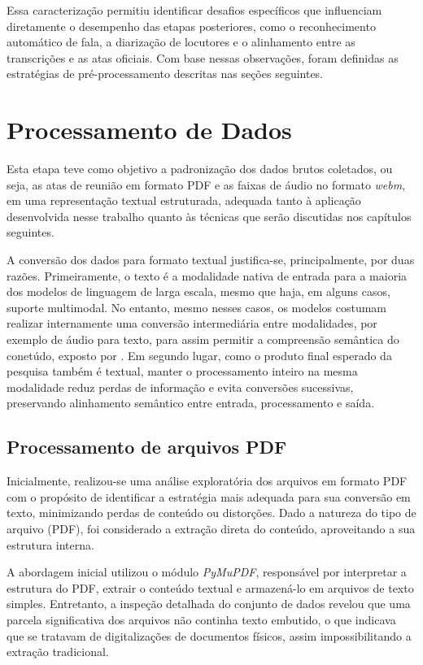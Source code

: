 Essa caracterização permitiu identificar desafios específicos que influenciam diretamente o desempenho das etapas posteriores, como o reconhecimento automático de fala, a diarização de locutores e o alinhamento entre as transcrições e as atas oficiais. Com base nessas observações, foram definidas as estratégias de pré-processamento descritas nas seções seguintes.

\section{Processamento de Dados}
\label{sec:processamento-de-dados}

Esta etapa teve como objetivo a padronização dos dados brutos coletados, ou seja, as atas de reunião em formato PDF e as faixas de áudio no formato \textit{webm}, em uma representação textual estruturada, adequada tanto à aplicação desenvolvida nesse trabalho quanto às técnicas que serão discutidas nos capítulos seguintes.

A conversão dos dados para formato textual justifica-se, principalmente, por duas razões. Primeiramente, o texto é a modalidade nativa de entrada para a maioria dos modelos de linguagem de larga escala, mesmo que haja, em alguns casos, suporte multimodal. No entanto, mesmo nesses casos, os modelos costumam realizar internamente uma conversão intermediária entre modalidades, por exemplo de áudio para texto, para assim permitir a compreensão semântica do conetúdo, exposto por . Em segundo lugar, como o produto final esperado da pesquisa também é textual, manter o processamento inteiro na mesma modalidade reduz perdas de informação e evita conversões sucessivas, preservando alinhamento semântico entre entrada, processamento e saída.

\subsection{Processamento de arquivos PDF}
\label{sec:processamento-de-arquivos-PDF}

Inicialmente, realizou-se uma análise exploratória dos arquivos em formato PDF com o propósito de identificar a estratégia mais adequada para sua conversão em texto, minimizando perdas de conteúdo ou distorções. Dado a natureza do tipo de arquivo (PDF), foi considerado a extração direta do conteúdo, aproveitando a sua estrutura interna. 

A abordagem inicial utilizou o módulo \textit{PyMuPDF}, responsável por interpretar a estrutura do PDF, extrair o conteúdo textual e armazená-lo em arquivos de texto simples. Entretanto, a inspeção detalhada do conjunto de dados revelou que uma parcela significativa dos arquivos não continha texto embutido, o que indicava que se tratavam de digitalizações de documentos físicos, assim impossibilitando a extração tradicional.

